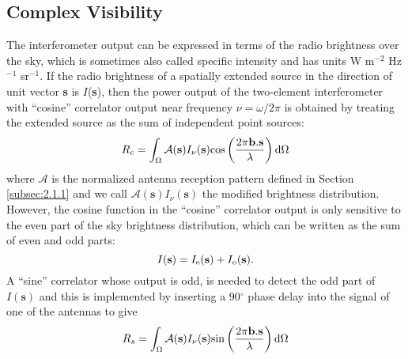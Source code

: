 \subsection{Complex Visibility}\label{subsec:6}
The interferometer output can be expressed in terms of the radio brightness over the sky, which is sometimes also called specific intensity and has units W m$^{-2}$ Hz$^{-1}$ sr$^{-1}$. If the radio brightness of a spatially extended source in the direction of unit vector \textbf{s} is $I$(\textbf{s}), then the power output of the two-element interferometer with ``cosine'' correlator output near frequency $\nu =\omega/2\pi$ is obtained by treating the extended source as the sum of independent point sources:
\begin{equation}
R_{c}=\int _{\Omega}\mathcal{A}(\textbf{s})I_{\nu}(\textbf{s}) \rm{cos}\left(\frac{2\pi \textbf{b}.\textbf{s}}{\lambda} \right)d\Omega
\end{equation}
where $\mathcal{A}$ is the normalized antenna reception pattern defined in Section \ref{subsec:2.1.1} and we call $\mathcal{A}(\textbf{s})I_{\nu}(\textbf{s})$ the modified brightness distribution. However, the cosine function in the  ``cosine'' correlator output is only sensitive to the even part of the sky brightness distribution, which can be written as the sum of even and odd parts:
\begin{equation}
I(\textbf{s})=I_{\rm{e}}(\textbf{s})+I_{\rm{o}}(\textbf{s}).
\end{equation}
A ``sine'' correlator whose output is odd, is needed to detect the odd part of $I(\textbf{s})$ and this is implemented by inserting a 90$^{\circ}$ phase delay into the signal of one of the antennas to give
\begin{equation}
R_{s}=\int _{\Omega}\mathcal{A}(\textbf{s})I_{\nu}(\textbf{s}) \rm{sin}\left(\frac{2\pi \textbf{b}.\textbf{s}}{\lambda} \right)d\Omega
\end{equation}

